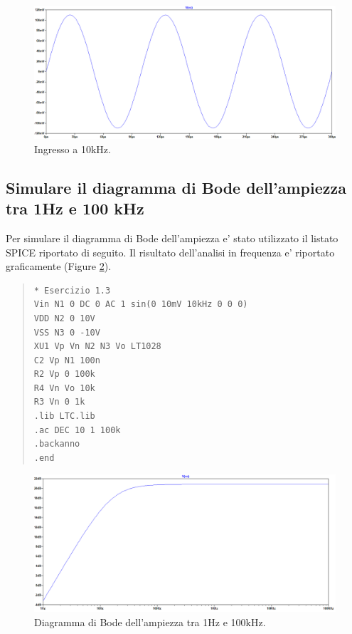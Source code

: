 \documentclass[a4paper,10pt]{article}
\begin{document}
\begin{figure}[h!]
	\centering
 	\includegraphics[width=0.8\linewidth]{plot1-2-3.png}
  	\caption{Ingresso a 10kHz.}
  	\label{fig:plot10khz}
\end{figure}

\subsection{Simulare il diagramma di Bode dell'ampiezza tra 1Hz e 100 kHz}
Per simulare il diagramma di Bode dell'ampiezza e' stato utilizzato il listato SPICE riportato di seguito. Il risultato dell'analisi in frequenza e' riportato graficamente (Figure \ref{fig:bode1}).
\begin{quote}
\begin{verbatim}
* Esercizio 1.3
Vin N1 0 DC 0 AC 1 sin(0 10mV 10kHz 0 0 0)
VDD N2 0 10V
VSS N3 0 -10V
XU1 Vp Vn N2 N3 Vo LT1028
C2 Vp N1 100n
R2 Vp 0 100k
R4 Vn Vo 10k
R3 Vn 0 1k
.lib LTC.lib
.ac DEC 10 1 100k
.backanno
.end
\end{verbatim}
\end{quote}

\begin{figure}[h!]
	\centering
 	\includegraphics[width=1\linewidth]{plot1-3-1.png}
  	\caption{Diagramma di Bode dell'ampiezza tra 1Hz e 100kHz.}
  	\label{fig:bode1}
\end{figure}
\end{document}
